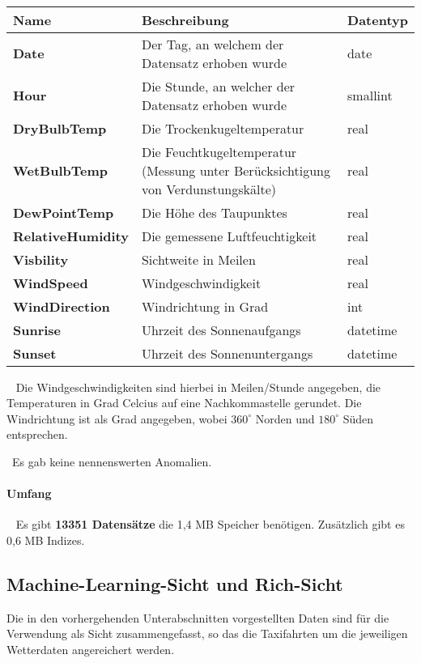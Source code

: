 ~\newline
\begin{center}
	\begin{tabular}{|p{}|p{}|p{}|}
		\hline
		Name & Beschreibung & Datentyp  \\ \hline
		\textbf{Date} & Der Tag, an welchem der Datensatz erhoben wurde & date \\ \hline
		\textbf{Hour} & Die Stunde, an welcher der Datensatz erhoben wurde & smallint \\ \hline
		\textbf{DryBulbTemp} & Die Trockenkugeltemperatur & real \\ \hline
		\textbf{WetBulbTemp} & Die Feuchtkugeltemperatur (Messung unter Berücksichtigung von Verdunstungskälte) & real \\ \hline	
		\textbf{DewPointTemp} & Die Höhe des Taupunktes & real\\ \hline
		\textbf{RelativeHumidity} & Die gemessene Luftfeuchtigkeit & real \\ \hline 
		\textbf{Visbility} & Sichtweite in Meilen & real\\ \hline
		\textbf{WindSpeed} & Windgeschwindigkeit & real\\ \hline
		\textbf{WindDirection} & Windrichtung in Grad & int \\ \hline
		\textbf{Sunrise} & Uhrzeit des Sonnenaufgangs & datetime \\ \hline
		\textbf{Sunset} & Uhrzeit des Sonnenuntergangs & datetime \\ \hline
	\end{tabular}
\end{center}
~\newline
Die Windgeschwindigkeiten sind hierbei in Meilen/Stunde angegeben, die Temperaturen in Grad Celcius auf eine Nachkommastelle gerundet. Die Windrichtung ist als Grad angegeben, wobei $360^\circ$ Norden und $180^\circ $ Süden entsprechen.

~\newline Es gab keine nennenswerten Anomalien. 
\paragraph{Umfang} ~\newline
Es gibt \textbf{13351 Datensätze} die 1,4 MB Speicher benötigen. Zusätzlich gibt es 0,6 MB Indizes.
\newpage
\subsection{Machine-Learning-Sicht und Rich-Sicht}
Die in den vorhergehenden Unterabschnitten vorgestellten Daten sind für die Verwendung als Sicht zusammengefasst, so das die Taxifahrten um die jeweiligen Wetterdaten angereichert werden. 

